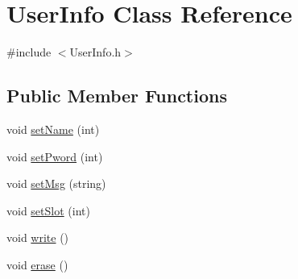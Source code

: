 \hypertarget{class_user_info}{\section{User\+Info Class Reference}
\label{class_user_info}
}


{\ttfamily \#include $<$User\+Info.\+h$>$}

\subsection*{Public Member Functions}
\begin{DoxyCompactItemize}
\item 
void \hyperlink{class_user_info_aae286fdcb33c3b03e3594d1ee9ff173c}{set\+Name} (int)
\item 
void \hyperlink{class_user_info_a842192f55f75001d0997adae6e96366d}{set\+Pword} (int)
\item 
void \hyperlink{class_user_info_a259bac361adc18e1164882ab0e385559}{set\+Msg} (string)
\item 
void \hyperlink{class_user_info_a8238748d34cc71a9b5b252f26c2131b4}{set\+Slot} (int)
\item 
void \hyperlink{class_user_info_ad3288e392f3fa242b3b66bc51cb85353}{write} ()
\item 
void \hyperlink{class_user_info_a1eab6f8154e00d4f389c95c1b9294ebe}{erase} ()
\end{DoxyCompactItemize}


